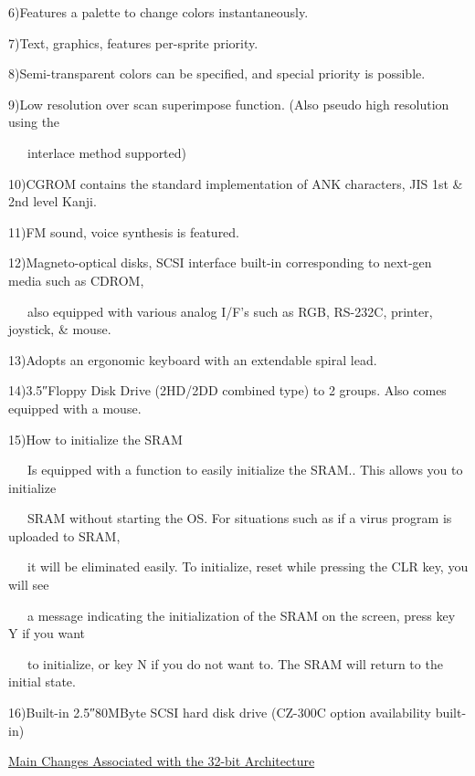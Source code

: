 ﻿\documentclass[twoside,a4paper,12pt]{article}
\begin{document}
6)Features a palette to change colors instantaneously.

7)Text, graphics, features per-sprite priority.

8)Semi-transparent colors can be specified, and special priority is possible.

9)Low resolution over scan superimpose function. (Also pseudo high resolution using the

\ \ \ interlace method supported)

10)CGROM contains the standard implementation of ANK characters, JIS 1st \& 2nd level Kanji.

11)FM sound, voice synthesis is featured.

12)Magneto-optical disks, SCSI interface built-in corresponding to next-gen media such as CDROM,

\ \ \ also equipped with various analog I/F's such as RGB, RS-232C, printer, joystick, \& mouse.

13)Adopts an ergonomic keyboard with an extendable spiral lead.

14)3.5″Floppy Disk Drive (2HD/2DD combined type) to 2 groups. Also comes equipped with a mouse.

15)How to initialize the SRAM

\ \ \ Is equipped with a function to easily initialize the SRAM.. This allows you to initialize

\ \ \ SRAM without starting the OS. For situations such as if a virus program is uploaded to SRAM,

\ \ \ it will be eliminated easily. To initialize, reset while pressing the CLR key, you will see

\ \ \ a message indicating the initialization of the SRAM on the screen, press key Y if you want

\ \ \ to initialize, or key N if you do not want to. The SRAM will return to the initial state.

16)Built-in 2.5″80MByte SCSI hard disk drive (CZ-300C option availability built-in)

\newpage

\normalsize\uline{Main Changes Associated with the 32-bit Architecture}
\end{document}
